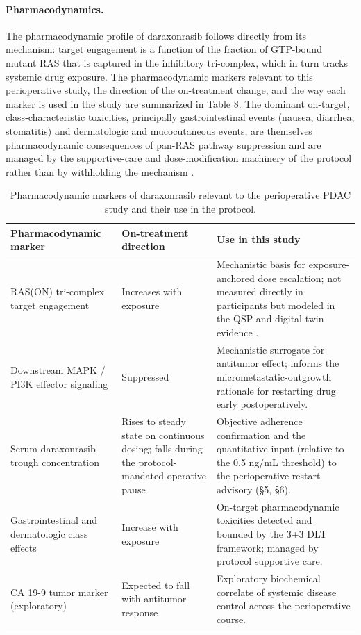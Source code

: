 \paragraph{Pharmacodynamics.}
The pharmacodynamic profile of daraxonrasib follows directly from its mechanism:
target engagement is a function of the fraction of GTP-bound mutant RAS that is
captured in the inhibitory tri-complex, which in turn tracks systemic drug
exposure. The pharmacodynamic markers relevant to this perioperative study, the
direction of the on-treatment change, and the way each marker is used in the
study are summarized in Table 8. The dominant on-target, class-characteristic
toxicities, principally gastrointestinal events (nausea, diarrhea, stomatitis)
and dermatologic and mucocutaneous events, are themselves pharmacodynamic
consequences of pan-RAS pathway suppression and are managed by the supportive-care
and dose-modification machinery of the protocol rather than by withholding the
mechanism \cite{onpremwhippl}.

\begin{table}[t]
\centering
\caption{Pharmacodynamic markers of daraxonrasib relevant to the perioperative
PDAC study and their use in the protocol.}
\label{tab:sec07-pd}
\begin{tabularx}{\textwidth}{L{3.7cm} L{2.4cm} Y}
\toprule
\textbf{Pharmacodynamic marker} & \textbf{On-treatment direction} & \textbf{Use in this study} \\
\midrule
RAS(ON) tri-complex target engagement & Increases with exposure & Mechanistic basis for exposure-anchored dose escalation; not measured directly in participants but modeled in the QSP and digital-twin evidence \cite{qspmetpancre}. \\
Downstream MAPK / PI3K effector signaling & Suppressed & Mechanistic surrogate for antitumor effect; informs the micrometastatic-outgrowth rationale for restarting drug early postoperatively. \\
Serum daraxonrasib trough concentration & Rises to steady state on continuous dosing; falls during the protocol-mandated operative pause & Objective adherence confirmation and the quantitative input (relative to the 0.5 ng/mL threshold) to the perioperative restart advisory (\S 5, \S 6). \\
Gastrointestinal and dermatologic class effects & Increase with exposure & On-target pharmacodynamic toxicities detected and bounded by the 3+3 DLT framework; managed by protocol supportive care. \\
CA 19-9 tumor marker (exploratory) & Expected to fall with antitumor response & Exploratory biochemical correlate of systemic disease control across the perioperative course. \\
\bottomrule
\end{tabularx}
\end{table}

